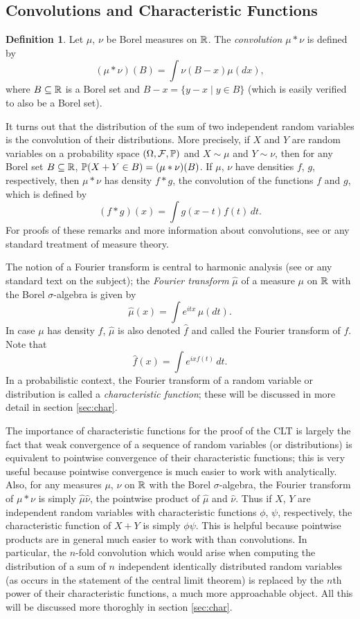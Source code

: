 \documentclass[leqno]{article}
\theoremstyle{definition}
\newtheorem{definition}[theorem]{Definition}
\newcommand{\bldset}[2]{\{{#1}\mid{#2}\}}
\begin{document}
\subsection{Convolutions and Characteristic Functions}

\begin{definition}
Let $\mu$, $\nu$ be Borel measures on $\R$. The {\em convolution} $\mu * \nu$ is defined by
\[ (\mu * \nu)(B) = \int \nu(B - x) \mu(dx), \]
where $B \subseteq \R$ is a Borel set and $B - x = \bldset{y - x}{y \in B}$ (which is easily verified to also be a Borel set).
\end{definition}

It turns out that the distribution of the sum of two independent random variables is the convolution of their distributions. More precisely, if $X$ and $Y$ are random variables on a probability space $(\Omega, \mathcal F, \P)$ and $X \sim \mu$ and $Y \sim \nu$, then for any Borel set $B \subseteq \R$,
$\P(X + Y \in B) = (\mu * \nu)(B)$. If $\mu$, $\nu$ have densities $f$, $g$, respectively, then $\mu * \nu$ has density $f * g$, the convolution of the functions $f$ and $g$, which is defined by
\[ (f * g)(x) = \int g(x - t) f(t) \, dt. \]
For proofs of these remarks and more information about convolutions, see \cite{billingsley} or any standard treatment of measure theory.

The notion of a Fourier transform is central to harmonic analysis (see \cite{katznelson} or any standard text on the subject); the {\em Fourier transform} $\hat \mu$ of a measure $\mu$ on $\R$ with the Borel $\sigma$-algebra is given by
\[ \hat \mu (x) = \int e^{itx} \, \mu(dt). \]
In case $\mu$ has density $f$, $\hat \mu$ is also denoted $\hat f$ and called the Fourier transform of $f$. Note that
\[ \hat f(x) = \int e^{ix f(t)} \, dt. \]
In a probabilistic context, the Fourier transform of a random variable or distribution is called a {\em characteristic function}; these will be discussed in more detail in section \ref{sec:char}.

The importance of characteristic functions for the proof of the CLT is largely the fact that weak convergence of a sequence of random variables (or distributions) is equivalent to pointwise convergence of their characteristic functions; this is very useful because pointwise convergence is much easier to work with analytically. Also, for any measures $\mu$, $\nu$ on $\R$ with the Borel $\sigma$-algebra, the Fourier transform of $\mu * \nu$ is simply $\hat \mu \hat \nu$, the pointwise product of $\hat \mu$ and $\hat \nu$. Thus if $X$, $Y$ are independent random variables with characteristic functions $\phi$, $\psi$, respectively, the characteristic function of $X + Y$ is simply $\phi\psi$. This is helpful because pointwise products are in general much easier to work with than convolutions. In particular, the $n$-fold convolution which would arise when computing the distribution of a sum of $n$ independent identically distributed random variables (as occurs in the statement of the central limit theorem) is replaced by the $n$th power of their characteristic functions, a much more approachable object. All this will be discussed more thoroghly in section \ref{sec:char}.
\end{document}

